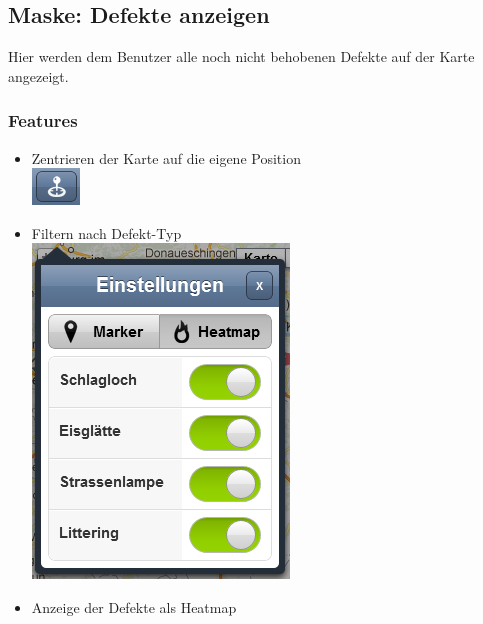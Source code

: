 \subsection{Maske: Defekte anzeigen}
Hier werden dem Benutzer alle noch nicht behobenen Defekte auf der Karte angezeigt.

\subsubsection{Features}
\begin{itemize}
\item Zentrieren der Karte auf die eigene Position \\ \includegraphics[scale=0.8]{images/usecase2-fixmystreet/features/features-report-center_map_button}
\item Filtern nach Defekt-Typ \\ \includegraphics[scale=0.8]{images/usecase2-fixmystreet/features/features-map-settings}
\item Anzeige der Defekte als Heatmap
\end{itemize}

